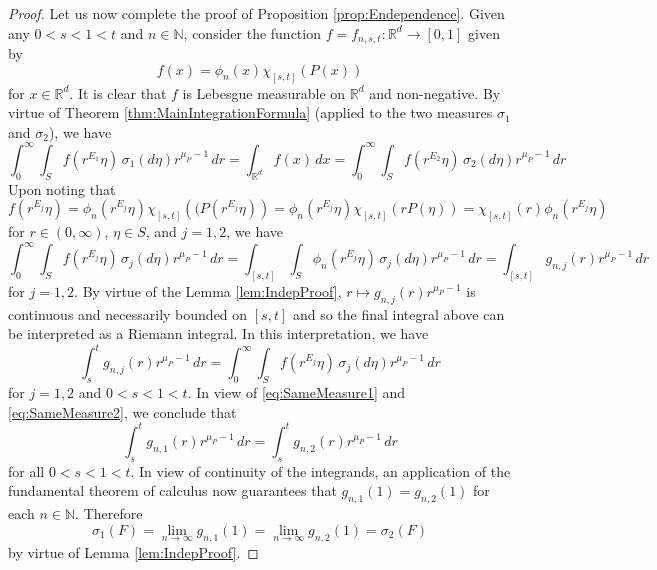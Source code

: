\documentclass[11pt]{article}
\theoremstyle{remark}
\begin{document}
\begin{proof}
\noindent Let us now complete the proof of Proposition \ref{prop:Endependence}. Given any $0<s<1< t$ and $n\in\mathbb{N}$, consider the function $f=f_{n,s,t}:\mathbb{R}^d\to [0,1]$ given by
\begin{equation*}
f(x)=\phi_n(x)\chi_{[s,t]}(P(x))
\end{equation*}
for $x\in\mathbb{R}^d$. It is clear that $f$ is Lebesgue measurable on $\mathbb{R}^d$ and non-negative. By virtue of Theorem \ref{thm:MainIntegrationFormula} (applied to the two measures $\sigma_1$ and $\sigma_2$), we have
\begin{equation}\label{eq:SameMeasure1}
\int_0^\infty \int_Sf(r^{E_1}\eta)\,\sigma_1(d\eta)r^{\mu_P-1}\,dr=\int_{\mathbb{R}^d}f(x)\,dx=\int_0^\infty \int_Sf(r^{E_2}\eta)\,\sigma_2(d\eta)r^{\mu_P-1}\,dr
\end{equation}
Upon noting that
\begin{equation*}
f(r^{E_j}\eta)=\phi_n(r^{E_j}\eta)\chi_{[s,t]}\left((P(r^{E_j}\eta)\right)=\phi_n(r^{E_j}\eta)\chi_{[s,t]}(rP(\eta))=\chi_{[s,t]}(r)\phi_n(r^{E_j}\eta)
\end{equation*}
for $r\in (0,\infty)$, $\eta\in S$, and $j=1,2$, we have
\begin{equation*}
\int_0^\infty\int_S f(r^{E_j}\eta)\,\sigma_j(d\eta)r^{\mu_P-1}\,dr=\int_{[s,t]}\int_S\phi_n(r^{E_j}\eta)\,\sigma_j(d\eta) r^{\mu_P-1}\,dr=\int_{[s,t]}g_{n,j}(r)r^{\mu_P-1}\,dr
\end{equation*}
for $j=1,2$. By virtue of the Lemma \ref{lem:IndepProof}, $r\mapsto g_{n,j}(r)r^{\mu_P-1}$ is continuous and necessarily bounded on $[s,t]$ and so the final integral above can be interpreted as a Riemann integral. In this interpretation, we have
\begin{equation}\label{eq:SameMeasure2}
\int_s^tg_{n,j}(r)r^{\mu_P-1}\,dr=\int_0^\infty \int_S f(r^{E_j}\eta)\,\sigma_j(d\eta)r^{\mu_P-1}\,dr
\end{equation}
for $j=1,2$ and $0<s<1<t$. In view of \eqref{eq:SameMeasure1} and \eqref{eq:SameMeasure2}, we conclude that
\begin{equation*}
\int_s^t g_{n,1}(r)r^{\mu_P-1}\,dr=\int_s^t g_{n,2}(r)r^{\mu_P-1}\,dr
\end{equation*}
for all $0<s<1<t$. In view of continuity of the integrands, an application of the fundamental theorem of calculus now guarantees that $g_{n,1}(1)=g_{n,2}(1)$ for each $n\in\mathbb{N}$. Therefore
\begin{equation*}
\sigma_1(F)=\lim_{n\to\infty}g_{n,1}(1)=\lim_{n\to\infty}g_{n,2}(1)=\sigma_2(F)
\end{equation*}
by virtue of Lemma \ref{lem:IndepProof}.
\end{proof}
\end{document}
